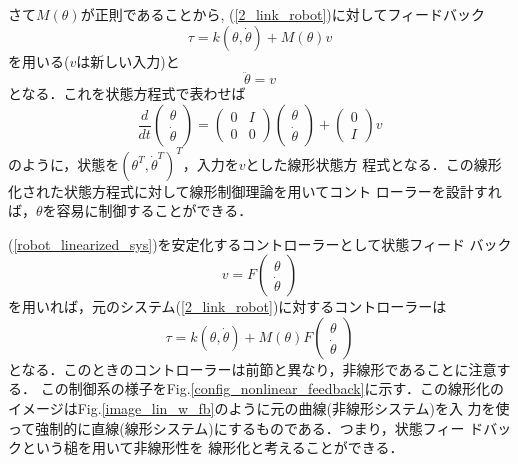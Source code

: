 さて$M(\theta)$が正則であることから,
(\ref{2_link_robot})に対してフィードバック
\begin{equation}
 \tau = k(\theta,\dot{\theta}) + M(\theta) v 
\end{equation}
を用いる($v$は新しい入力)と
\begin{equation}
 \ddot{\theta} = v 
\end{equation}
となる．これを状態方程式で表わせば
\begin{equation}
 \frac{d}{dt}
  \left(\begin{array}{c}
   \theta \\
	 \dot{\theta}
	\end{array}\right)
  =
  \left(\begin{array}{cc}
   0 & I \\
	 0 & 0 
	\end{array}\right)
  \left(\begin{array}{c}
   \theta \\
	 \dot{\theta}
	\end{array}\right)
  +
  \left(\begin{array}{c}
   0 \\
	 I
	\end{array}\right)
  v
  \label{robot_linearized_sys}
\end{equation}
のように，状態を$(\theta^T, \dot{\theta}^T)^T$，入力を$v$とした線形状態方
程式となる．この線形化された状態方程式に対して線形制御理論を用いてコント
ローラーを設計すれば，$\theta$を容易に制御することができる．

(\ref{robot_linearized_sys})を安定化するコントローラーとして状態フィード
バック
\begin{equation}
 v = F
  \left(\begin{array}{c}
   \theta \\
	 \dot{\theta}
	\end{array}\right)
\end{equation}
を用いれば，元のシステム(\ref{2_link_robot})に対するコントローラーは
\begin{equation}
 \tau = k(\theta, \dot{\theta}) + M(\theta) F
  \left(\begin{array}{c}
   \theta \\
	 \dot{\theta}
	\end{array}\right)
\end{equation}
となる．このときのコントローラーは前節と異なり，非線形であることに注意する．
この制御系の様子をFig.\ref{config_nonlinear_feedback}に示す．この線形化の
イメージはFig.\ref{image_lin_w_fb}のように元の曲線(非線形システム)を入
力を使って強制的に直線(線形システム)にするものである．つまり，状態フィー
ドバックという槌を用いて非線形性を  線形化と考えることができる．

